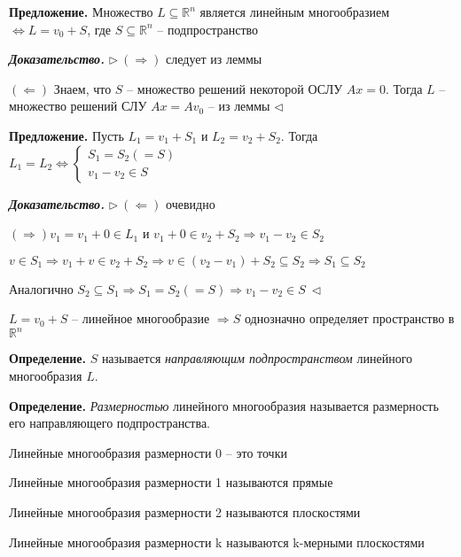 \vspace{\baselineskip}
\textbf{Предложение.} Множество $L \subseteq \mathbb{R}^n$ является линейным многообразием $\Leftrightarrow L = v_0 + S$, где $S \subseteq \mathbb{R}^n$ -- подпространство

\vspace{\baselineskip}
\textbf{\textit{Доказательство.}} $\rhd \ (\Rightarrow)$ следует из леммы

$(\Leftarrow)$ Знаем, что $S$ -- множество решений некоторой ОСЛУ $Ax = 0$. Тогда $L$ -- множество решений СЛУ $Ax = A v_0$ -- из леммы $\lhd$

\vspace{\baselineskip}
\textbf{Предложение.} Пусть $L_1 = v_1 + S_1$ и $L_2 = v_2 + S_2$. Тогда $L_1 = L_2 \Leftrightarrow \begin{cases} S_1 = S_2 (= S) \\ v_1 - v_2 \in S \end{cases}$

\vspace{\baselineskip}
\textbf{\textit{Доказательство.}} $\rhd \ (\Leftarrow)$ очевидно

$(\Rightarrow) v_1 = v_1 + 0 \in L_1$ и $v_1 + 0 \in v_2 + S_2 \Rightarrow v_1 - v_2 \in S_2$

$v \in S_1 \Rightarrow v_1 + v \in v_2 + S_2 \Rightarrow v \in (v_2 - v_1) + S_2 \subseteq S_2 \Rightarrow S_1 \subseteq S_2$

Аналогично $S_2 \subseteq S_1 \Rightarrow S_1 = S_2 (=S) \Rightarrow v_1 - v_2 \in S \ \lhd$

\vspace{\baselineskip}
$L = v_0 + S$ -- линейное многообразие $\Rightarrow S$ однозначно определяет пространство в $\mathbb{R}^n$

\vspace{\baselineskip}
\textbf{Определение.} $S$ называется \textit{направляющим подпространством} линейного многообразия $L$.

\vspace{\baselineskip}
\textbf{Определение.} \textit{Размерностью} линейного многообразия называется размерность его направляющего подпространства.

Линейные многообразия размерности 0 -- это точки

Линейные многообразия размерности 1 называются прямые

Линейные многообразия размерности 2 называются плоскостями

Линейные многообразия размерности k называются k-мерными плоскостями


